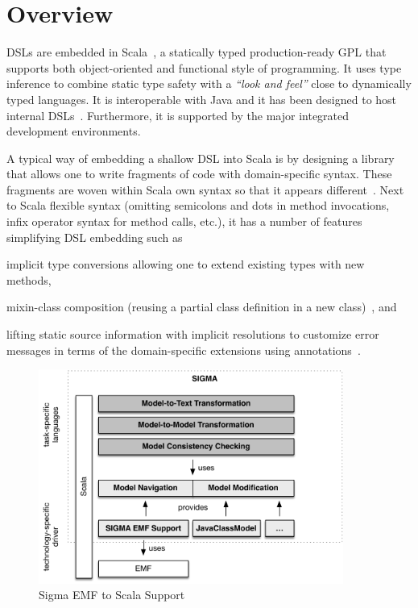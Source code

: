 
\section{\SIGMA Overview}
\label{sec:SigmaOverview}

\SIGMA DSLs are embedded in Scala~\cite{Odersky2004}, a statically typed production-ready GPL that supports both object-oriented and functional style of programming.
It uses type inference to combine static type safety with a \emph{``look and feel''} close to dynamically typed languages.
It is interoperable with Java and it has been designed to host internal DSLs~\cite{Chafi2010}.
Furthermore, it is supported by the major integrated development environments.

A typical way of embedding a shallow DSL into Scala is by designing a library that allows one to write fragments of code with domain-specific syntax.
These fragments are woven within Scala own syntax so that it appears different~\cite{Dubochet2011}.
Next to Scala flexible syntax (\Eg omitting semicolons and dots in method invocations, infix operator syntax for method calls, etc.), it has a number of features simplifying DSL embedding such as
%
\begin{inparaitem}[]
  \item implicit type conversions allowing one to extend existing types with new methods,
  \item mixin-class composition (\Ie reusing a partial class definition in a new class)~\cite{Odersky2004}, and 
  \item lifting static source information with implicit resolutions to customize error messages in terms of the domain-specific extensions using annotations~\cite{Moors2012}.
\end{inparaitem}

\begin{figure}[h!bt]
  \centering
  \includegraphics[width=10cm]{figures/SigmaOverview.pdf}
  \caption{Sigma EMF to Scala Support}
  \label{fig:SigmaStack}
\end{figure}

